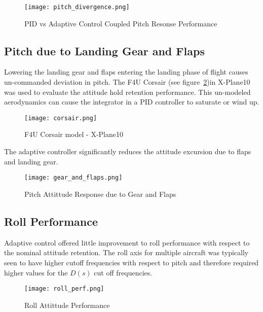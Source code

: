 \begin{figure}[h!]
 \centering
  \texttt{[image: pitch\_divergence.png]}
  \caption{PID vs \Lone Adaptive Control Coupled Pitch Resonse Performance}
  \label{fig:pitch_divergence}
\end{figure}

\subsection{Pitch due to Landing Gear and Flaps}
Lowering the landing gear and flaps entering the landing phase of flight causes un-commanded deviation in pitch.  The F4U Corsair (see figure~\ref{fig:corsair})in X-Plane10 was used to evaluate the attitude hold retention performance.  This un-modeled aerodynamics can cause the integrator in a \ac{PID} controller to saturate or wind up. 

\begin{figure}[h!]
 \centering
  \texttt{[image: corsair.png]}
  \caption{F4U Corsair model - X-Plane10}
  \label{fig:corsair}
\end{figure}

The \Lone adaptive controller significantly reduces the attitude excursion due to flaps and landing gear.
\begin{figure}[h!]
 \centering
  \texttt{[image: gear\_and\_flaps.png]}
  \caption{Pitch Attittude Response due to Gear and Flaps}
  \label{fig:gear_and_flaps}
\end{figure}

\subsection{Roll Performance}
Adaptive control offered little improvement to roll performance with respect to the nominal attitude retention.  The roll axis for multiple aircraft was typically seen to have higher cutoff frequencies with respect to pitch and therefore required higher values for the $D(s)$ cut off frequencies.
\begin{figure}[h!]
 \centering
  \texttt{[image: roll\_perf.png]}
  \caption{Roll Attittude Performance}
  \label{fig:roll_perf}
\end{figure}

